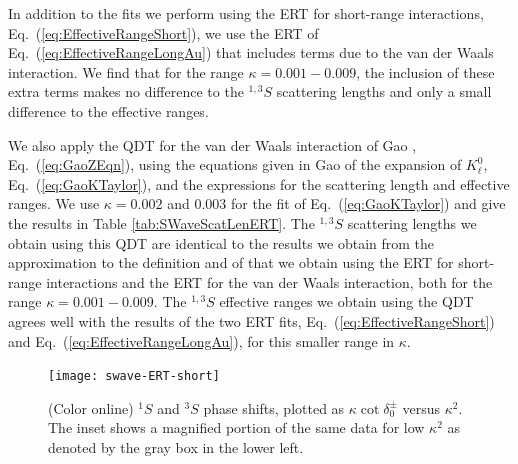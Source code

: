 \documentclass[preprint,showpacs,showkeys,preprintnumbers,amsmath,amssymb,longbibliography,pra,aps]{revtex4-1}
\begin{document}
{In addition to the fits we perform using the ERT for short-range interactions,
Eq.~(\ref{eq:EffectiveRangeShort}), we use the ERT of Eq.~(\ref{eq:EffectiveRangeLongAu})
that includes terms due to the van der Waals interaction. We find
that for the range $\kappa = 0.001 - 0.009$, the inclusion of these extra terms
makes no difference to the $^{1,3}S$ scattering lengths and only a
small difference to the effective ranges.

We also apply the QDT for the van der Waals interaction of Gao
\cite{Gao1998}, Eq.~(\ref{eq:GaoZEqn}), using the equations given in
Gao \cite{Gao1998a} of the expansion of $K_\ell^0$, Eq.~(\ref{eq:GaoKTaylor}),
and the expressions for the scattering length and effective ranges. We use
$\kappa = 0.002$ and $0.003$ for the fit of Eq.~(\ref{eq:GaoKTaylor}) and 
give the results in Table \ref{tab:SWaveScatLenERT}. The $^{1,3}S$
scattering lengths we obtain using this QDT are
identical to the results we obtain from the approximation to the definition
and of that we obtain using the ERT for short-range 
interactions and the ERT for the van der Waals interaction, both for the
range $\kappa = 0.001 - 0.009$. The $^{1,3}S$ effective ranges we obtain using
the QDT agrees well with the results of the two ERT fits, Eq.~(\ref{eq:EffectiveRangeShort}) and
Eq.~(\ref{eq:EffectiveRangeLongAu}), for this smaller range in $\kappa$.

\begin{figure}[H]
	\centering
	\texttt{[image: swave-ERT-short]}
	\caption{(Color online) $^1S$ and $^3S$ phase shifts, plotted as
$\kappa \cot \delta_0^\pm$ versus $\kappa^2$. The inset shows a magnified
portion of the same data for low $\kappa^2$ as denoted by the gray box in the lower left.}
	\label{fig:swave-ERT-short}
\end{figure}

}
\end{document}
